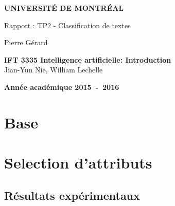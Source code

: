 \documentclass[a4paper,11pt]{article}
\begin{document}
\begin{titlepage}
\begin{center}
\textbf{\textsc{UNIVERSIT\'E DE MONTR\'EAL}}\\
\vfill{}\vfill{}
\begin{center}{\Huge Rapport : TP2 - Classification de textes}\end{center}{\Huge \par}
\begin{center}{\large Pierre Gérard}\end{center}{\Huge \par}
\vfill{}\vfill{} \vfill{}
\begin{center}{\large \textbf{IFT 3335 Intelligence artificielle: Introduction}}\hfill{\\Jian-Yun Nie, William Lechelle}\end{center}{\large\par}
\vfill{}\vfill{}\enlargethispage{3cm}
\textbf{Année académique 2015~-~2016}
\end{center}
\end{titlepage}



\tableofcontents

\pagebreak

\section{Base}

\section{Selection d'attributs}


\subsection{Résultats expérimentaux}
\end{document}
